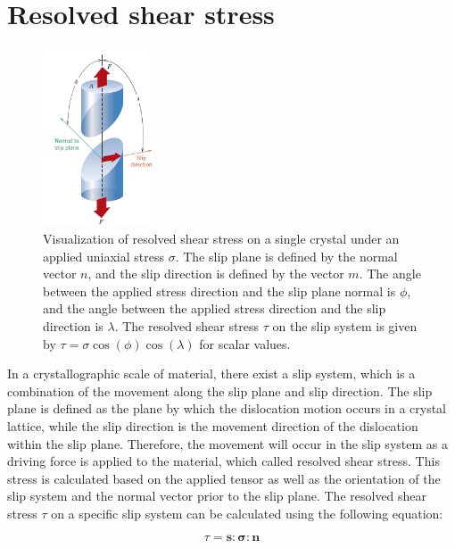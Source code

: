 \documentclass[12pt]{article}
\begin{document}
\section{Resolved shear stress}
\begin{figure}[H]
    \centering
    \includegraphics[width=0.3\textwidth]{images/RSS_New.png}
    \caption{Visualization of resolved shear stress on a single crystal under an applied uniaxial stress $\sigma$. 
    The slip plane is defined by the normal vector $n$, and the slip direction is defined by the vector $m$. 
    The angle between the applied stress direction and the slip plane normal is $\phi$, and the angle between 
    the applied stress direction and the slip direction is $\lambda$. The resolved shear stress $\tau$ on the slip system 
    is given by $\tau = \sigma \cos(\phi) \cos(\lambda)$ for scalar values. \cite{callister2010}}
    \label{fig:resolved_shear_stress}
\end{figure}

\hspace{2em}In a crystallographic scale of material, there exist a slip system, which is a combination
of the movement along the slip plane and slip direction. The slip plane is defined as the plane by which 
the dislocation motion occurs in a crystal lattice, while the slip direction is the movement direction 
of the dislocation within the slip plane. Therefore, the movement will occur in the slip system as a driving
force is applied to the material, which called resolved shear stress. This stress is calculated based
on the applied tensor as well as the orientation of the slip system and the normal vector prior to the slip plane.
The resolved shear stress $\tau$ on a specific slip system can be calculated using the following equation:

\begin{equation}
    \tau = \boldsymbol{s} : \boldsymbol{\sigma} : \boldsymbol{n}
\end{equation}
\end{document}
